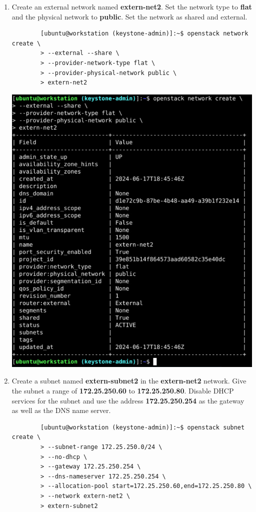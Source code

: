 \documentclass[letterpaper, 12pt]{article}
\begin{document}
\begin{enumerate}
    \item Create an external network named \textbf{extern-net2}.
    Set the network type to \textbf{flat} and the physical network to \textbf{public}.
    Set the network as shared and external.
    \begin{lstlisting}
        [ubuntu@workstation (keystone-admin)]:~$ openstack network create \
        > --external --share \
        > --provider-network-type flat \
        > --provider-physical-network public \
        > extern-net2
    \end{lstlisting}

    \begin{center}
        \includegraphics[width=\linewidth]{images/part1/step15.png}
    \end{center}

    \item Create a subnet named \textbf{extern-subnet2} in the \textbf{extern-net2} network.
    Give the subnet a range of \textbf{172.25.250.60} to \textbf{172.25.250.80}.
    Disable DHCP services for the subnet and use the address \textbf{172.25.250.254} as the gateway as well as the DNS name server.
    \begin{lstlisting}
        [ubuntu@workstation (keystone-admin)]:~$ openstack subnet create \
        > --subnet-range 172.25.250.0/24 \
        > --no-dhcp \
        > --gateway 172.25.250.254 \
        > --dns-nameserver 172.25.250.254 \
        > --allocation-pool start=172.25.250.60,end=172.25.250.80 \
        > --network extern-net2 \
        > extern-subnet2
    \end{lstlisting}


\end{enumerate}
\end{document}
